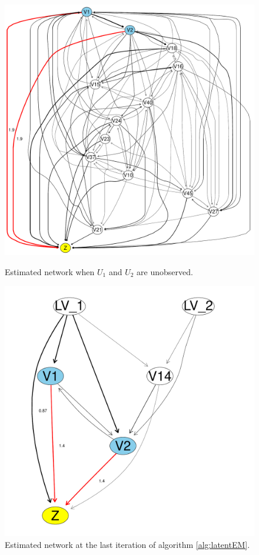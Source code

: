 \documentclass[letterpaper]{article}
\begin{document}
\begin{figure}[ht!]
\begin{minipage}[t]{0.33\linewidth}
     \includegraphics[width=\linewidth]{./images/estimated_network_missingdata.pdf}
     \caption{\label{fig_missing} Estimated network when $U_1$ and
      $U_2$ are unobserved.}
   \end{minipage}\hfill
   \begin{minipage}[t]{0.33\linewidth }
    \includegraphics[width=\linewidth]{./images/estimated_network_infered.pdf}
    \caption{\label{fig_estnet_infered} Estimated network at the last
      iteration of algorithm \ref{alg:latentEM}.}
  \end{minipage}
\end{figure}
\end{document}
